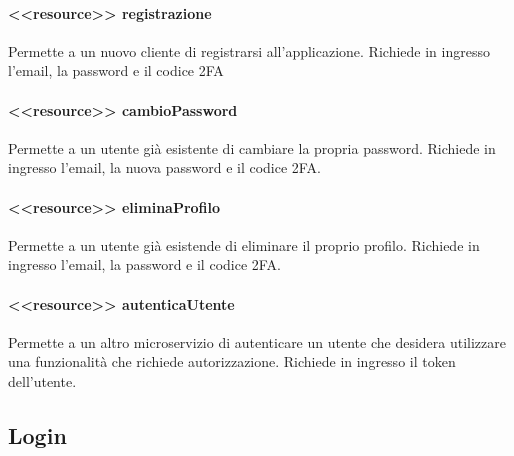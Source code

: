 \documentclass{report}
\begin{document}
\paragraph*{<<resource>> registrazione}
Permette a un nuovo cliente di registrarsi all'applicazione. 
Richiede in ingresso l'email, la password e il codice 2FA 

\paragraph*{<<resource>> cambioPassword}
Permette a un utente già esistente  di cambiare la propria password.
Richiede in ingresso l'email, la nuova password e il codice 2FA.

\paragraph*{<<resource>> eliminaProfilo}
Permette a un utente già esistende di eliminare il proprio profilo.
Richiede in ingresso l'email, la password e il codice 2FA.

\paragraph*{<<resource>> autenticaUtente}
Permette a un altro microservizio di autenticare un utente che desidera utilizzare una funzionalità che richiede autorizzazione.
Richiede in ingresso il token dell'utente.

\subsection{Login}
\end{document}
